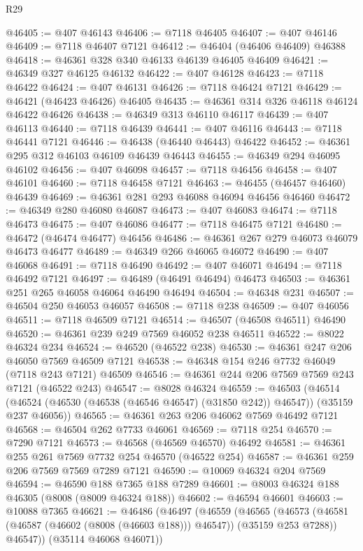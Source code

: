 \begin{lexlean}{R29}
\begin{coremodule}
@46405 := @407 @46143
@46406 := @7118 @46405
@46407 := @407 @46146
@46409 := @7118 @46407 @7121
@46412 := @46404 (@46406 @46409) @46388
@46418 := @46361 @328 @340 @46133 @46139 @46405 @46409
@46421 := @46349 @327 @46125 @46132
@46422 := @407 @46128
@46423 := @7118 @46422
@46424 := @407 @46131
@46426 := @7118 @46424 @7121
@46429 := @46421 (@46423 @46426) @46405
@46435 := @46361 @314 @326 @46118 @46124 @46422 @46426
@46438 := @46349 @313 @46110 @46117
@46439 := @407 @46113
@46440 := @7118 @46439
@46441 := @407 @46116
@46443 := @7118 @46441 @7121
@46446 := @46438 (@46440 @46443) @46422
@46452 := @46361 @295 @312 @46103 @46109 @46439 @46443
@46455 := @46349 @294 @46095 @46102
@46456 := @407 @46098
@46457 := @7118 @46456
@46458 := @407 @46101
@46460 := @7118 @46458 @7121
@46463 := @46455 (@46457 @46460) @46439
@46469 := @46361 @281 @293 @46088 @46094 @46456 @46460
@46472 := @46349 @280 @46080 @46087
@46473 := @407 @46083
@46474 := @7118 @46473
@46475 := @407 @46086
@46477 := @7118 @46475 @7121
@46480 := @46472 (@46474 @46477) @46456
@46486 := @46361 @267 @279 @46073 @46079 @46473 @46477
@46489 := @46349 @266 @46065 @46072
@46490 := @407 @46068
@46491 := @7118 @46490
@46492 := @407 @46071
@46494 := @7118 @46492 @7121
@46497 := @46489 (@46491 @46494) @46473
@46503 := @46361 @251 @265 @46058 @46064 @46490 @46494
@46504 := @46348 @231
@46507 := @46504 @250 @46053 @46057
@46508 := @7118 @238
@46509 := @407 @46056
@46511 := @7118 @46509 @7121
@46514 := @46507 (@46508 @46511) @46490
@46520 := @46361 @239 @249 @7569 @46052 @238 @46511
@46522 := @8022 @46324 @234
@46524 := @46520 (@46522 @238)
@46530 := @46361 @247 @206 @46050 @7569 @46509 @7121
@46538 := @46348 @154 @246 @7732 @46049 (@7118 @243 @7121) @46509
@46546 := @46361 @244 @206 @7569 @7569 @243 @7121 (@46522 @243)
@46547 := @8028 @46324
@46559 := @46503
    (@46514 (@46524 (@46530 (@46538 (@46546 @46547) (@31850 @242)) @46547)) (@35159 @237 @46056))
@46565 := @46361 @263 @206 @46062 @7569 @46492 @7121
@46568 := @46504 @262 @7733 @46061
@46569 := @7118 @254
@46570 := @7290 @7121
@46573 := @46568 (@46569 @46570) @46492
@46581 := @46361 @255 @261 @7569 @7732 @254 @46570 (@46522 @254)
@46587 := @46361 @259 @206 @7569 @7569 @7289 @7121
@46590 := @10069 @46324 @204 @7569
@46594 := @46590 @188 @7365 @188 @7289
@46601 := @8003 @46324 @188 @46305 (@8008 (@8009 @46324 @188))
@46602 := @46594 @46601
@46603 := @10088 @7365
@46621 := @46486
    (@46497
      (@46559
        (@46565
          (@46573 (@46581 (@46587 (@46602 (@8008 (@46603 @188))) @46547)) (@35159 @253 @7288))
          @46547))
      (@35114 @46068 @46071))

\end{coremodule}
\end{lexlean}
